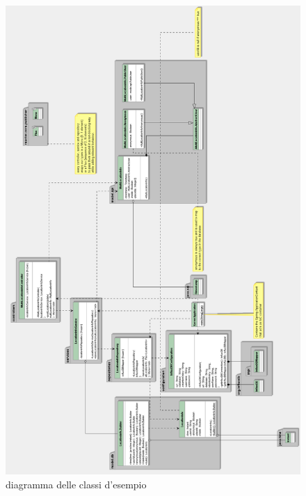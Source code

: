 \documentclass[../manuale-sviluppatore.tex]{subfiles}
\begin{document}
  \begin{figure}[H]
    \centering
    \includegraphics[width=\textwidth,height=\textheight]{img/server-influxDB-write-endpoint.png}
    \caption{diagramma delle classi d'esempio}%
     \label{fig: diagramma delle classi d'esempio}
  \end{figure}
\end{document}
